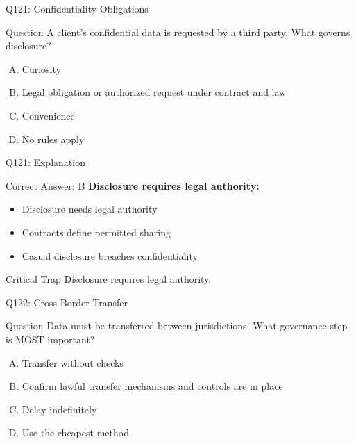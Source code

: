 \documentclass{beamer}
\begin{document}
	\begin{frame}{Q121: Confidentiality Obligations}
		\begin{block}{Question}
			A client's confidential data is requested by a third party. What governs disclosure?
		\end{block}
		\begin{enumerate}[(A)]
			\item Curiosity
			\item Legal obligation or authorized request under contract and law
			\item Convenience
			\item No rules apply
		\end{enumerate}
	\end{frame}
	
	\begin{frame}{Q121: Explanation}
		\begin{block}{Correct Answer: B}
			\textbf{Disclosure requires legal authority:}
			\begin{itemize}
				\item Disclosure needs legal authority
				\item Contracts define permitted sharing
				\item Casual disclosure breaches confidentiality
			\end{itemize}
		\end{block}
		\begin{alertblock}{Critical Trap}
			Disclosure requires legal authority.
		\end{alertblock}
	\end{frame}
	
	\begin{frame}{Q122: Cross-Border Transfer}
		\begin{block}{Question}
			Data must be transferred between jurisdictions. What governance step is MOST important?
		\end{block}
		\begin{enumerate}[(A)]
			\item Transfer without checks
			\item Confirm lawful transfer mechanisms and controls are in place
			\item Delay indefinitely
			\item Use the cheapest method
		\end{enumerate}
	\end{frame}
	
\end{document}
